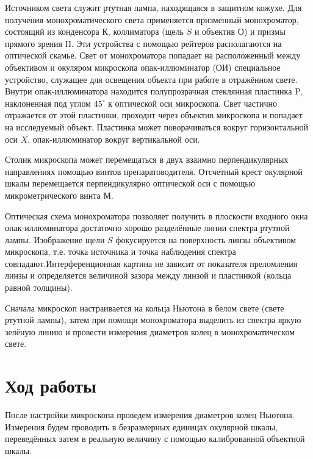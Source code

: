 \documentclass[a4paper, 12pt]{article}%
\begin{document}
\item Источником света служит ртутная лампа, находящаяся в защитном кожухе. Для получения монохроматического света применяется призменный монохроматор, состоящий из конденсора $ К $, коллиматора (щель $ S $ и объектив $ О $) и призмы прямого зрения $ П $. Эти устройства с помощью рейтеров располагаются на оптической скамье. Свет от монохроматора попадает на расположенный между объективом и окуляром микроскопа опак-иллюминатор (ОИ)  специальное устройство, служащее для освещения объекта при работе в отражённом свете. Внутри опак-иллюминатора находится полупрозрачная стеклянная пластинка P, наклоненная под углом $ 45^\circ $ к оптической оси микроскопа. Свет частично отражается от этой пластинки, проходит через объектив микроскопа и попадает на исследуемый объект. Пластинка может поворачиваться вокруг горизонтальной оси $ X $, опак-иллюминатор вокруг вертикальной оси.

\item Столик микроскопа может перемещаться в двух взаимно перпендикулярных направлениях помощью винтов препаратоводителя. Отсчетный крест окулярной шкалы перемещается перпендикулярно оптической оси с помощью микрометрического винта $ М $.
	
\item Оптическая схема монохроматора позволяет получить в плоскости входного окна опак-иллюминатора достаточно хорошо разделённые линии спектра ртутной лампы. Изображение щели $ S $ фокусируется на поверхность линзы объективом микроскопа, т.е. точка источника и точка наблюдения спектра совпадают.Интерференционная картина не зависит от показателя преломления линзы и определяется величиной зазора между линзой и пластинкой (кольца равной толщины).

\item Сначала микроскоп настраивается на кольца Ньютона в белом свете (свете ртутной лампы), затем при помощи монохроматора выделить из спектра яркую зелёную линию и провести измерения диаметров колец в монохроматическом свете. 

\item      
	\section{Ход работы}
	

\item После настройки микроскопа проведем измерения диаметров колец Ньютона. Измерения будем проводить в безразмерных единицах окулярной шкалы, переведённых затем в реальную величину с помощью калиброванной объектной шкалы. 
	
\end{document}
